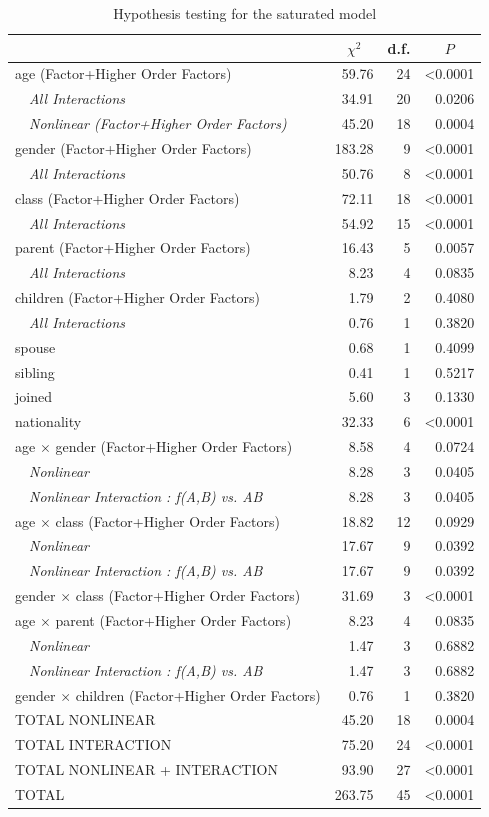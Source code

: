 \documentclass[]{interact}
\theoremstyle{plain}%
\theoremstyle{definition}
\theoremstyle{remark}
\begin{document}
\begin{table}[h]
{\small
\caption{Hypothesis testing for the saturated model\label{fone-anova}} 
\begin{center}
\begin{tabular}{lrrr}
\hline\hline
\multicolumn{1}{l}{}&\multicolumn{1}{c}{$\chi^{2}$}&\multicolumn{1}{c}{d.f.}&\multicolumn{1}{c}{$P$}\tabularnewline
\hline
age  (Factor+Higher Order Factors)& 59.76&24&\textless 0.0001\tabularnewline
~~\emph{All Interactions}& 34.91&20&0.0206\tabularnewline
~~\emph{Nonlinear (Factor+Higher Order Factors)}& 45.20&18&0.0004\tabularnewline
gender  (Factor+Higher Order Factors)&183.28& 9&\textless 0.0001\tabularnewline
~~\emph{All Interactions}& 50.76& 8&\textless 0.0001\tabularnewline
class  (Factor+Higher Order Factors)& 72.11&18&\textless 0.0001\tabularnewline
~~\emph{All Interactions}& 54.92&15&\textless 0.0001\tabularnewline
parent  (Factor+Higher Order Factors)& 16.43& 5&0.0057\tabularnewline
~~\emph{All Interactions}&  8.23& 4&0.0835\tabularnewline
children  (Factor+Higher Order Factors)&  1.79& 2&0.4080\tabularnewline
~~\emph{All Interactions}&  0.76& 1&0.3820\tabularnewline
spouse&  0.68& 1&0.4099\tabularnewline
sibling&  0.41& 1&0.5217\tabularnewline
joined&  5.60& 3&0.1330\tabularnewline
nationality& 32.33& 6&\textless 0.0001\tabularnewline
age $\times$ gender  (Factor+Higher Order Factors)&  8.58& 4&0.0724\tabularnewline
~~\emph{Nonlinear}&  8.28& 3&0.0405\tabularnewline
~~\emph{Nonlinear Interaction : f(A,B) vs. AB}&  8.28& 3&0.0405\tabularnewline
age $\times$ class  (Factor+Higher Order Factors)& 18.82&12&0.0929\tabularnewline
~~\emph{Nonlinear}& 17.67& 9&0.0392\tabularnewline
~~\emph{Nonlinear Interaction : f(A,B) vs. AB}& 17.67& 9&0.0392\tabularnewline
gender $\times$ class  (Factor+Higher Order Factors)& 31.69& 3&\textless 0.0001\tabularnewline
age $\times$ parent  (Factor+Higher Order Factors)&  8.23& 4&0.0835\tabularnewline
~~\emph{Nonlinear}&  1.47& 3&0.6882\tabularnewline
~~\emph{Nonlinear Interaction : f(A,B) vs. AB}&  1.47& 3&0.6882\tabularnewline
gender $\times$ children  (Factor+Higher Order Factors)&  0.76& 1&0.3820\tabularnewline
TOTAL NONLINEAR& 45.20&18&0.0004\tabularnewline
TOTAL INTERACTION& 75.20&24&\textless 0.0001\tabularnewline
TOTAL NONLINEAR + INTERACTION& 93.90&27&\textless 0.0001\tabularnewline
TOTAL&263.75&45&\textless 0.0001\tabularnewline
\hline
\end{tabular}\end{center}}
\end{table}
\end{document}
